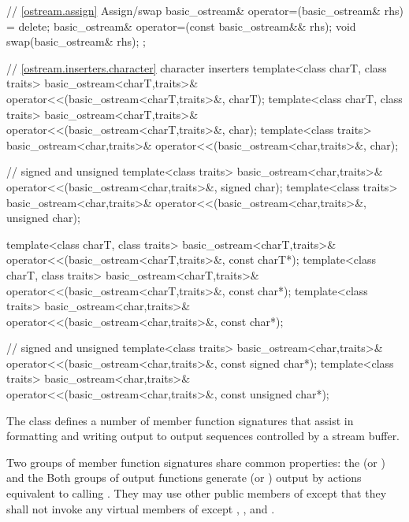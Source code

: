 \begin{codeblock}
{{    // \ref{ostream.assign} Assign/swap
    basic_ostream& operator=(basic_ostream& rhs) = delete;
    basic_ostream& operator=(const basic_ostream&& rhs);
    void swap(basic_ostream& rhs);
  };

  // \ref{ostream.inserters.character} character inserters
  template<class charT, class traits>
    basic_ostream<charT,traits>& operator<<(basic_ostream<charT,traits>&,
                                            charT);
  template<class charT, class traits>
    basic_ostream<charT,traits>& operator<<(basic_ostream<charT,traits>&,
                                            char);
  template<class traits>
    basic_ostream<char,traits>& operator<<(basic_ostream<char,traits>&,
                                           char);

  // signed and unsigned
  template<class traits>
    basic_ostream<char,traits>& operator<<(basic_ostream<char,traits>&,
                                           signed char);
  template<class traits>
    basic_ostream<char,traits>& operator<<(basic_ostream<char,traits>&,
                                           unsigned char);

  template<class charT, class traits>
    basic_ostream<charT,traits>& operator<<(basic_ostream<charT,traits>&,
                                            const charT*);
  template<class charT, class traits>
    basic_ostream<charT,traits>& operator<<(basic_ostream<charT,traits>&,
                                            const char*);
  template<class traits>
    basic_ostream<char,traits>& operator<<(basic_ostream<char,traits>&,
                                           const char*);

  // signed and unsigned
  template<class traits>
    basic_ostream<char,traits>& operator<<(basic_ostream<char,traits>&,
                                           const signed char*);
  template<class traits>
    basic_ostream<char,traits>& operator<<(basic_ostream<char,traits>&,
                                           const unsigned char*);
}
\end{codeblock}

\pnum
The class
defines a number of member function
signatures that assist in formatting and writing output to output sequences
controlled by a stream buffer.

\pnum
Two groups of member function signatures share common properties:
the
(or
)
and the
Both groups of output functions generate (or
)
output
by actions equivalent to calling
.
They may use other public members of
except that they shall not invoke any virtual members of
except
,
,
and
.

